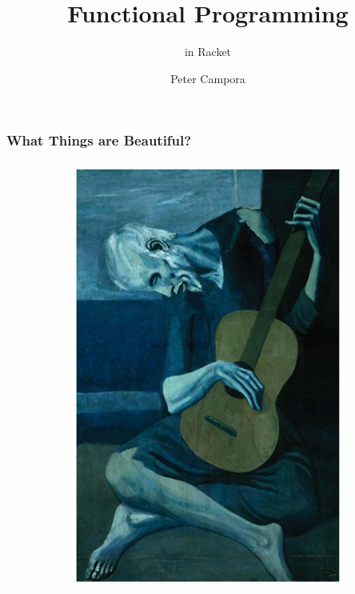 \documentclass{beamer}
\title{Functional Programming}
\subtitle{in Racket}
\author{Peter Campora}
\institute{ULL}
\begin{document}
\begin{frame}
\titlepage
\end{frame}
 
\begin{frame}
  \frametitle{What Things are Beautiful?}
  \begin{figure}[t]
    \begin{subfigure}[b]{.3\textwidth}
      \includegraphics[width=.9\textwidth]{images/old-guitarist.jpg}       
    \end{subfigure}
    \pause
    \begin{subfigure}[b]{.3\textwidth}

\end{subfigure}
\end{figure}
\end{frame}
\end{document}

